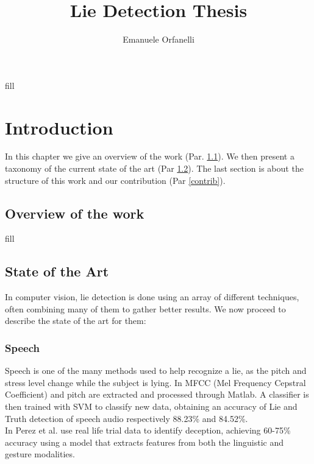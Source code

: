 \documentclass[LaM,binding=0.6cm,english,noexaminfo]{sapthesis}
\title{Lie Detection Thesis}
\author{Emanuele Orfanelli}
\begin{document}
\frontmatter

\maketitle

\dedication{Dedicated to\\ my Family and Friends}

\begin{acknowledgments}
fill
\end{acknowledgments}

\tableofcontents



\mainmatter

\chapter{Introduction}
In this chapter we give an overview of the work (Par. \ref{overview}). We then present a taxonomy of the current state of the art (Par \ref{sota}). The last section is about the structure of this work and our contribution (Par \ref{contrib}).

\section{Overview of the work} \label{overview}
fill

\section{State of the Art} \label{sota}
In computer vision, lie detection is done using an array of different techniques, often combining many of them to gather better results. We now proceed to describe the state of the art for them:

\subsection*{Speech}
Speech is one of the many methods used to help recognize a lie, as the pitch and  stress level change while the subject is lying. In \cite{relidss} MFCC (Mel Frequency Cepstral Coefficient) and pitch are extracted and processed through Matlab. A classifier is then trained with SVM to classify new data, obtaining an accuracy of Lie and Truth detection of speech audio respectively 88.23\% and 84.52\%. \\
In \cite{Perez-Rosas:2015:DDU:2818346.2820758} \cite{Mihalcea:2013:ADD:2522848.2522888} Perez et al. use real life trial data to identify deception, achieving 60-75\% accuracy using a model that extracts features from both the linguistic and gesture modalities.
 
\end{document}
